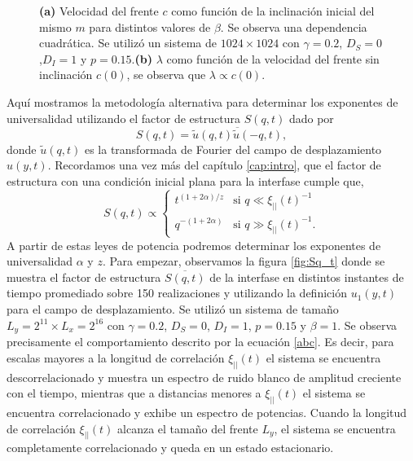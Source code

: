 \begin{figure}[h]
\begin{subfigure}{0.55\textwidth}
    \caption{}
\end{subfigure}
    \caption{\textbf{(a)} Velocidad del frente $c$ como función de la inclinación inicial del mismo $m$ para distintos valores de $\beta$. Se observa una dependencia cuadrática. Se utilizó un sistema de $1024\times1024$ con $\gamma = 0.2$, $D_S=0$,$D_I=1$ y $p=0.15$.\textbf{(b)} $\lambda$ como función de la velocidad del frente sin inclinación $c(0)$, se observa que $\lambda\propto c(0)$.}
    \label{fig:tilted_velocity}
\end{figure}


Aquí mostramos la metodología alternativa para determinar los exponentes de universalidad utilizando el factor de estructura $S(q,t)$ dado por 
\begin{equation}
    S(q,t) = \overline{\tilde{u}(q,t)\tilde{u}(-q,t)},
\end{equation}
donde $\tilde{u}(q,t)$ es la transformada de Fourier del campo de desplazamiento $u(y,t)$. Recordamos una vez más del capítulo \ref{cap:intro}, que el factor de estructura con una condición inicial plana para la interfase cumple que,
\begin{equation}
    S(q,t) \propto 
    \begin{cases}
        t^{(1+2\alpha)/z} & \text{si } q \ll \xi_{||}(t)^{-1} \\
        q^{-(1+2\alpha)} & \text{si } q \gg \xi_{||}(t)^{-1}.
    \end{cases}
    \label{abc}
\end{equation}
A partir de estas leyes de potencia podremos determinar los exponentes de universalidad $\alpha$ y $z$. Para empezar, observamos la figura \ref{fig:Sq_t} donde se muestra el factor de estructura $\overline{S(q,t)}$ de la interfase en distintos instantes de tiempo promediado sobre 150 realizaciones y utilizando la definición $u_1(y,t)$ para el campo de desplazamiento. Se utilizó un sistema de tamaño $L_y = 2^{11}\times L_x = 2^{16}$ con $\gamma = 0.2$, $D_S = 0$, $D_I = 1$, $p = 0.15$ y $\beta = 1$. Se observa precisamente el comportamiento descrito por la ecuación \ref{abc}. Es decir, para escalas mayores a la longitud de correlación $\xi_{||}(t)$ el sistema se encuentra descorrelacionado y muestra un espectro de ruido blanco de amplitud creciente con el tiempo, mientras que a distancias menores a $\xi_{||}(t)$ el sistema se encuentra correlacionado y exhibe un espectro de potencias. Cuando la longitud de correlación $\xi_{||}(t)$ alcanza el tamaño del frente $L_y$, el sistema se encuentra completamente correlacionado y queda en un estado estacionario.

